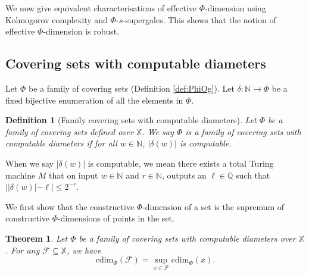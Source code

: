 \documentclass[11pt]{article}
\newtheorem{theorem}{Theorem}
\newtheorem{definition}{Definition}
\newcommand{\N}{\mathbb{N}}
\newcommand{\Q}{\mathbb{Q}}
\newcommand{\cdim}{\mathrm{cdim}}
\newcommand{\F}{{\mathcal{F}}}
\newcommand{\X}{{\mathbb{X}}}
\renewcommand{\F}{\mathcal{F}}
\newcommand{\x}{x}
\begin{document}
We now give equivalent characterisations of effective $\Phi$-dimension using Kolmogorov complexity and $\Phi$-$s$-supergales. This shows that the notion of effective $\Phi$-dimension is robust.

\subsection{Covering sets with computable diameters}

Let $\Phi$ be a family of covering sets (Definition \ref{def:PhiOg}).
Let $\delta : \N \to \Phi$ be a fixed bijective enumeration of all the elements in $\Phi$.

\begin{definition} [Family covering sets with computable diameters] \label{def:CompPhi}
	Let $\Phi$ be a family of covering sets defined over $\X$. We say $\Phi$ is a family of covering sets with computable diameters if for all $w \in \N$, $|\delta(w)|$ is computable.
\end{definition}

When we say $|\delta(w)|$ is computable, we mean there exists a total Turing machine $M$ that  on input $w \in \N$ and $r \in \N$, outputs an $\ell \in \Q$ such that $||\delta(w)| - \ell | \leq 2^{-r}$.

We first show that the constructive $\Phi$-dimension of a set is the supremum of constructive $\Phi$-dimensions of points in the set. 

\begin{theorem} \label{thm:CDimSetfromPoint}
	Let $\Phi$ be a family of covering sets with computable diameters   over $\X$. For any $\F \subseteq \X$, we have 
	$$\cdim_\Phi(\F) = \sup\limits_{\x \in \F} \cdim_\Phi(\x).$$
\end{theorem}
\end{document}
